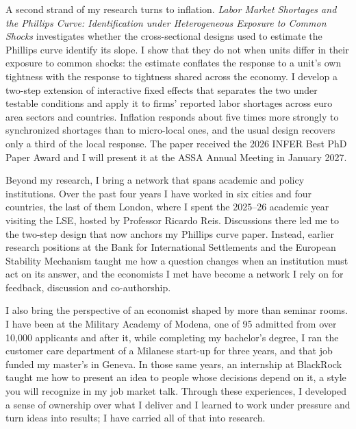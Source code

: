 \documentclass[11pt]{article}
\begin{document}
A second strand of my research turns to inflation. \textit{Labor Market Shortages and the Phillips Curve: Identification under Heterogeneous Exposure to Common Shocks} investigates whether the cross-sectional designs used to estimate the Phillips curve identify its slope. I show that they do not when units differ in their exposure to common shocks: the estimate conflates the response to a unit's own tightness with the response to tightness shared across the economy. I develop a two-step extension of interactive fixed effects that separates the two under testable conditions and apply it to firms' reported labor shortages across euro area sectors and countries. Inflation responds about five times more strongly to synchronized shortages than to micro-local ones, and the usual design recovers only a third of the local response. The paper received the 2026 INFER Best PhD Paper Award and I will present it at the ASSA Annual Meeting in January 2027.

Beyond my research, I bring a network that spans academic and policy institutions. Over the past four years I have worked in six cities and four countries, the last of them London, where I spent the 2025--26 academic year visiting the LSE, hosted by Professor Ricardo Reis. Discussions there led me to the two-step design that now anchors my Phillips curve paper. Instead, earlier research positions at the Bank for International Settlements and the European Stability Mechanism taught me how a question changes when an institution must act on its answer, and the economists I met have become a network I rely on for feedback, discussion and co-authorship.

I also bring the perspective of an economist shaped by more than seminar rooms. I have been at the Military Academy of Modena, one of 95 admitted from over 10,000 applicants and after it, while completing my bachelor's degree, I ran the customer care department of a Milanese start-up for three years, and that job funded my master's in Geneva. In those same years, an internship at BlackRock taught me how to present an idea to people whose decisions depend on it, a style you will recognize in my job market talk. Through these experiences, I developed a sense of ownership over what I deliver and I learned to work under pressure and turn ideas into results; I have carried all of that into research. %
\end{document}
